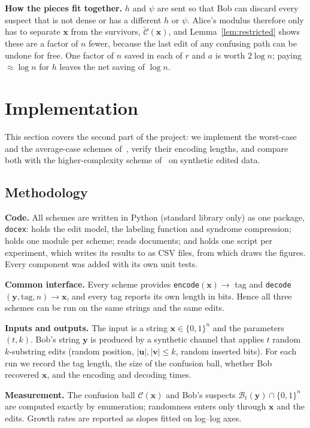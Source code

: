 \documentclass[journal,10pt]{IEEEtran}
\newcommand{\B}{\mathcal{B}}
\newcommand{\C}{\mathcal{C}}
\newcommand{\Ct}{\widetilde{\mathcal{C}}}
\newcommand{\bx}{\mathbf{x}}
\newcommand{\by}{\mathbf{y}}
\newcommand{\bu}{\mathbf{u}}
\newcommand{\bv}{\mathbf{v}}
\begin{document}
\textbf{How the pieces fit together.} $h$ and $\psi$ are sent so that Bob can discard every suspect that is not dense or has a different $h$ or $\psi$. Alice's modulus therefore only has to separate $\bx$ from the survivors, $\Ct(\bx)$, and Lemma~\ref{lem:restricted} shows these are a factor of $n$ fewer, because the last edit of any confusing path can be undone for free. One factor of $n$ saved in each of $r$ and $a$ is worth $2\log n$; paying $\approx\log n$ for $h$ leaves the net saving of $\log n$.

\section{Implementation}\label{sec:impl}
This section covers the second part of the project: we implement the worst-case and the average-case schemes of~\cite{narayanan}, verify their encoding lengths, and compare both with the higher-complexity scheme of~\cite{li21} on synthetic edited data.

\subsection{Methodology}
\textbf{Code.} All schemes are written in Python (standard library only) as one package, \texttt{docex}:  holds the edit model, the labeling function and syndrome compression;  holds one module per scheme;  reads documents; and  holds one script per experiment, which writes its results to  as CSV files, from which  draws the figures. Every component was added with its own unit tests.

\textbf{Common interface.} Every scheme provides \texttt{encode}$(\bx)\to$ tag and \texttt{decode}$(\by,\text{tag},n)\to\bx$, and every tag reports its own length in bits. Hence all three schemes can be run on the same strings and the same edits.

\textbf{Inputs and outputs.} The input is a string $\bx\in\{0,1\}^n$ and the parameters $(t,k)$. Bob's string $\by$ is produced by a synthetic channel that applies $t$ random $k$-substring edits (random position, $|\bu|,|\bv|\le k$, random inserted bits). For each run we record the tag length, the size of the confusion ball, whether Bob recovered $\bx$, and the encoding and decoding times.

\textbf{Measurement.} The confusion ball $\C(\bx)$ and Bob's suspects $\B_t(\by)\cap\{0,1\}^n$ are computed exactly by enumeration; randomness enters only through $\bx$ and the edits. Growth rates are reported as slopes fitted on log--log axes.
\end{document}
